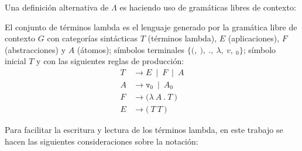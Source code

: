 Una definición alternativa de \( Λ \) es haciendo uso de gramáticas libres de contexto:

\begin{defn}
  El conjunto de términos lambda es el lenguaje generado por la gramática libre de contexto \( G \) con categorías sintácticas \( T \) (términos lambda), \( E \) (aplicaciones), \( F \) (abstracciones) y \( A \) (átomos); símbolos terminales \( \{\mathtt{(},\ \mathtt{)},\ \mathtt{.},\ λ,\ v,\ {}_{0}\} \); símbolo inicial \( T \) y con las siguientes reglas de producción:
  \label{terminos-cfg}
  \begin{subequations}
    \begin{align}
      \label{terminos-cfg:terminos} \tag{a}
      T & \rightarrow E\ \mid\ F\ \mid\ A \\
      \label{terminos-cfg:atomos} \tag{b}
      A & \rightarrow \mathtt{v}_{0}\ \mid\ A {}_{0} \\
      \label{terminos-cfg:abstracciones} \tag{c}
      F & \rightarrow \mathtt{(} λ\ A\ \mathtt{.}\ T\ \mathtt{)} \\
      \label{terminos-cfg:aplicaciones} \tag{d}
      E & \rightarrow \mathtt{(}\ T\ T\ \mathtt{)}
    \end{align}
  \end{subequations}
\end{defn}

Para facilitar la escritura y lectura de los términos lambda, en este trabajo se hacen las siguientes consideraciones sobre la notación:

